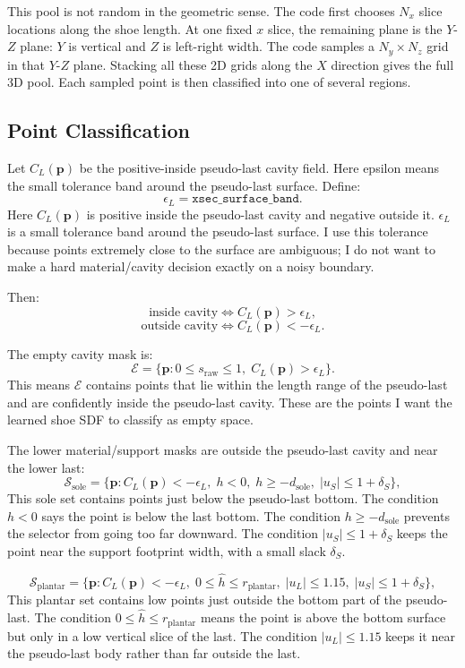 \documentclass[11pt]{article}
\newcommand{\pt}{\mathbf{p}}
\begin{document}
This pool is not random in the geometric sense.  The code first chooses
\(N_x\) slice locations along the shoe length.  At one fixed \(x\) slice, the
remaining plane is the \(Y\)-\(Z\) plane: \(Y\) is vertical and \(Z\) is
left-right width.  The code samples a \(N_y\times N_z\) grid in that
\(Y\)-\(Z\) plane.  Stacking all these 2D grids along the \(X\) direction gives
the full 3D pool.  Each sampled point is then classified into one of several
regions.

\subsection{Point Classification}

Let \(C_L(\pt)\) be the positive-inside pseudo-last cavity field.  Here epsilon
means the small tolerance band around the pseudo-last surface.  Define:
\[
\epsilon_L=\texttt{xsec\_surface\_band}.
\]
Here \(C_L(\pt)\) is positive inside the pseudo-last cavity and negative outside
it.  \(\epsilon_L\) is a small tolerance band around the pseudo-last surface.
I use this tolerance because points extremely close to the surface are
ambiguous; I do not want to make a hard material/cavity decision exactly on a
noisy boundary.

Then:
\[
\text{inside cavity} \iff C_L(\pt)>\epsilon_L,
\]
\[
\text{outside cavity} \iff C_L(\pt)<-\epsilon_L.
\]

The empty cavity mask is:
\[
\mathcal{E}
=
\{\pt:
0\le s_{\text{raw}}\le 1,\;
C_L(\pt)>\epsilon_L
\}.
\]
This means \(\mathcal{E}\) contains points that lie within the length range of
the pseudo-last and are confidently inside the pseudo-last cavity.  These are
the points I want the learned shoe SDF to classify as empty space.

The lower material/support masks are outside the pseudo-last cavity and near the
lower last:
\[
\mathcal{S}_{\text{sole}}
=
\{\pt:
C_L(\pt)<-\epsilon_L,\;
h<0,\;
h\ge -d_{\text{sole}},\;
|u_S|\le 1+\delta_S
\},
\]
This sole set contains points just below the pseudo-last bottom.  The condition
\(h<0\) says the point is below the last bottom.  The condition
\(h\ge -d_{\text{sole}}\) prevents the selector from going too far downward.
The condition \(|u_S|\le 1+\delta_S\) keeps the point near the support footprint
width, with a small slack \(\delta_S\).

\[
\mathcal{S}_{\text{plantar}}
=
\{\pt:
C_L(\pt)<-\epsilon_L,\;
0\le \hat{h}\le r_{\text{plantar}},\;
|u_L|\le 1.15,\;
|u_S|\le 1+\delta_S
\},
\]
This plantar set contains low points just outside the bottom part of the
pseudo-last.  The condition \(0\le \hat{h}\le r_{\text{plantar}}\) means the
point is above the bottom surface but only in a low vertical slice of the last.
The condition \(|u_L|\le 1.15\) keeps it near the pseudo-last body rather than
far outside the last.
\end{document}
